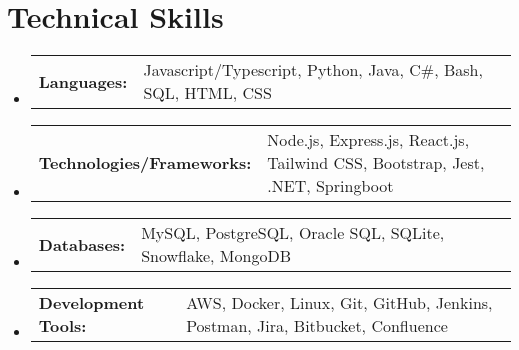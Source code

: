 \documentclass[letterpaper,11pt]{article}
\makeatletter
\newcommand{\resumeSubItem}[2]{ 
  \item
    \begin{tabular*}{\textwidth}{@{}l p{\dimexpr\textwidth-1.5cm}@{}}{\small\textbf{#1}}\hspace{0.5em} & {\small #2} \\ 
    \end{tabular*}\vspace{-6pt}
}
\newcommand{\resumeSubHeadingListStart}{\begin{itemize}[leftmargin=0.0in, label={}]}
\newcommand{\resumeSubHeadingListEnd}{\end{itemize}}
\makeatother
\begin{document}
\section{Technical Skills}
  \resumeSubHeadingListStart
    \resumeSubItem{Languages:}
      {Javascript/Typescript, Python, Java, C\#, Bash, SQL, HTML, CSS}
    \resumeSubItem{Technologies/Frameworks:}
      {Node.js, Express.js, React.js, Tailwind CSS, Bootstrap, Jest, .NET, Springboot}
    \resumeSubItem{Databases:}
      {MySQL, PostgreSQL, Oracle SQL, SQLite, Snowflake, MongoDB}
    \resumeSubItem{Development Tools:}
      {AWS, Docker, Linux, Git, GitHub, Jenkins, Postman, Jira, Bitbucket, Confluence}
  \resumeSubHeadingListEnd
\end{document}
